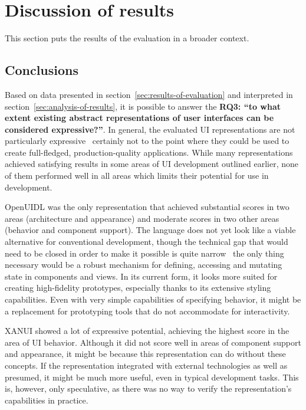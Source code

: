 \section{Discussion of results}\label{sec:evaluation-discussion-of-results}

This section puts the results of the evaluation in a broader context.

\subsection{Conclusions}\label{subsec:conclusions}

Based on data presented in section~\ref{sec:results-of-evaluation} and interpreted in section~\ref{sec:analysis-of-results}, it is possible to answer the \textbf{RQ3: \enquote{to what extent existing abstract representations of user interfaces can be considered expressive?}}.
In general, the evaluated UI representations are not particularly expressive \textendash\ certainly not to the point where they could be used to create full-fledged, production-quality applications.
While many representations achieved satisfying results in some areas of UI development outlined earlier, none of them performed well in all areas which limits their potential for use in development.

OpenUIDL was the only representation that achieved substantial scores in two areas (architecture and appearance) and moderate scores in two other areas (behavior and component support).
The language does not yet look like a viable alternative for conventional development, though the technical gap that would need to be closed in order to make it possible is quite narrow \textendash\ the only thing necessary would be a robust mechanism for defining, accessing and mutating state in components and views.
In its current form, it looks more suited for creating high-fidelity prototypes, especially thanks to its extensive styling capabilities.
Even with very simple capabilities of specifying behavior, it might be a replacement for prototyping tools that do not accommodate for interactivity.

XANUI showed a lot of expressive potential, achieving the highest score in the area of UI behavior.
Although it did not score well in areas of component support and appearance, it might be because this representation can do without these concepts.
If the representation integrated with external technologies as well as presumed, it might be much more useful, even in typical development tasks.
This is, however, only speculative, as there was no way to verify the representation's capabilities in practice.


